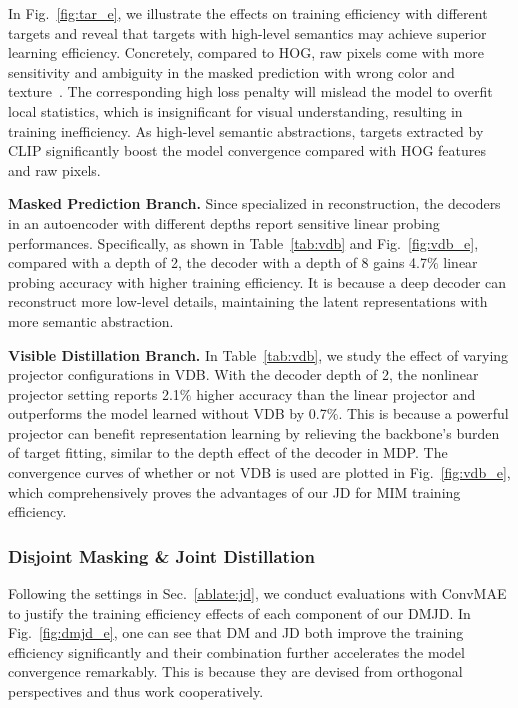 \documentclass[lettersize,journal]{IEEEtran}
\begin{document}
In Fig.~\ref{fig:tar_e}, we illustrate the effects on training efficiency with different targets and reveal that targets with high-level semantics may achieve superior learning efficiency.
Concretely, compared to HOG, raw pixels come with more sensitivity and ambiguity in the masked prediction with wrong color and texture~\cite{2021arXiv211209133W}. The corresponding high loss penalty will mislead the model to overfit local statistics, which is insignificant for visual understanding, resulting in training inefficiency. As high-level semantic abstractions, targets extracted by CLIP significantly boost the model convergence compared with HOG features and raw pixels.

\textbf{Masked Prediction Branch.}
Since specialized in reconstruction, the decoders in an autoencoder with different depths report sensitive linear probing performances. Specifically, as shown in Table~\ref{tab:vdb} and Fig.~\ref{fig:vdb_e}, compared with a depth of 2, the decoder with a depth of 8 gains 4.7$\%$ linear probing accuracy with higher training efficiency. It is because a deep decoder can reconstruct more low-level details, maintaining the latent representations with more semantic abstraction.

\textbf{Visible Distillation Branch.}
In Table~\ref{tab:vdb}, we study the effect of varying projector configurations in VDB. With the decoder depth of 2, the nonlinear projector setting reports 2.1$\%$ higher accuracy than the linear projector and outperforms the model learned without VDB by 0.7$\%$.
This is because a powerful projector can benefit representation learning by relieving the backbone's burden of target fitting, similar to the depth effect of the decoder in MDP. 
The convergence curves of whether or not VDB is used are plotted in Fig.~\ref{fig:vdb_e}, which comprehensively proves the advantages of our JD for MIM training efficiency.

\subsubsection{\textbf{Disjoint Masking \& Joint Distillation}}
Following the settings in Sec.~\ref{ablate:jd}, we conduct evaluations with ConvMAE to justify the training efficiency effects of each component of our DMJD.
In Fig.~\ref{fig:dmjd_e}, one can see that DM and JD both improve the training efficiency significantly and their combination further  accelerates the model convergence remarkably.
This is because they are devised from orthogonal perspectives and thus work cooperatively. 
\end{document}

